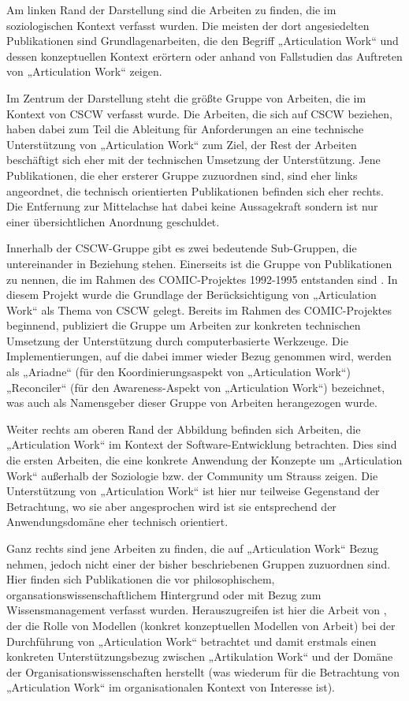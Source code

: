 Am linken Rand der Darstellung sind die Arbeiten zu finden, die im soziologischen Kontext verfasst wurden. Die meisten der dort angesiedelten Publikationen sind Grundlagenarbeiten, die den Begriff „Articulation Work“ und dessen konzeptuellen Kontext erörtern oder anhand von Fallstudien das Auftreten von „Articulation Work“ zeigen.

Im Zentrum der Darstellung steht die größte Gruppe von Arbeiten, die im Kontext von \gls{CSCW} verfasst wurde. Die Arbeiten, die sich auf \gls{CSCW} beziehen, haben dabei zum Teil die Ableitung für Anforderungen an eine technische Unterstützung von „Articulation Work“ zum Ziel, der Rest der Arbeiten beschäftigt sich eher mit der technischen Umsetzung der Unterstützung. Jene Publikationen, die eher ersterer Gruppe zuzuordnen sind, sind eher links angeordnet, die technisch orientierten Publikationen befinden sich eher rechts. Die Entfernung zur Mittelachse hat dabei keine Aussagekraft sondern ist nur einer übersichtlichen Anordnung geschuldet. 

Innerhalb der \gls{CSCW}-Gruppe gibt es zwei bedeutende Sub-Gruppen, die untereinander in Beziehung stehen. Einerseits ist die Gruppe von Publikationen zu nennen, die im Rahmen des COMIC-Projektes 1992-1995 entstanden sind \citep{Rodden95}. In diesem Projekt wurde die Grundlage der Berücksichtigung von „Articulation Work“ als Thema von \gls{CSCW} gelegt. Bereits im Rahmen des COMIC-Projektes beginnend, publiziert die Gruppe um \citeauthor{Simone00} Arbeiten zur konkreten technischen Umsetzung der Unterstützung durch computerbasierte Werkzeuge. Die Implementierungen, auf die dabei immer wieder Bezug genommen wird, werden als „Ariadne“ (für den Koordinierungsaspekt von „Articulation Work“) „Reconciler“ (für den Awareness-Aspekt von „Articulation Work“) bezeichnet, was auch als Namensgeber dieser Gruppe von Arbeiten herangezogen wurde.

Weiter rechts am oberen Rand der Abbildung befinden sich Arbeiten, die „Articulation Work“ im Kontext der Software-Entwicklung betrachten. Dies sind die ersten Arbeiten, die eine konkrete Anwendung der Konzepte um „Articulation Work“ außerhalb der Soziologie bzw. der Community um Strauss zeigen. Die Unterstützung von „Articulation Work“ ist hier nur teilweise Gegenstand der Betrachtung, wo sie aber angesprochen wird ist sie entsprechend der Anwendungsdomäne eher technisch orientiert.

Ganz rechts sind jene Arbeiten zu finden, die auf „Articulation Work“ Bezug nehmen, jedoch nicht einer der bisher beschriebenen Gruppen zuzuordnen sind. Hier finden sich Publikationen die vor philosophischem, organsationswissenschaftlichem Hintergrund oder mit Bezug zum Wissensmanagement verfasst wurden. Herauszugreifen ist hier die Arbeit von \citet{Jorgensen04}, der die Rolle von Modellen (konkret konzeptuellen Modellen von Arbeit) bei der Durchführung von „Articulation Work“ betrachtet und damit erstmals einen konkreten Unterstützungsbezug zwischen „Artikulation Work“ und der Domäne der Organisationswissenschaften herstellt (was wiederum für die Betrachtung von „Articulation Work“ im organisationalen Kontext von Interesse ist).

